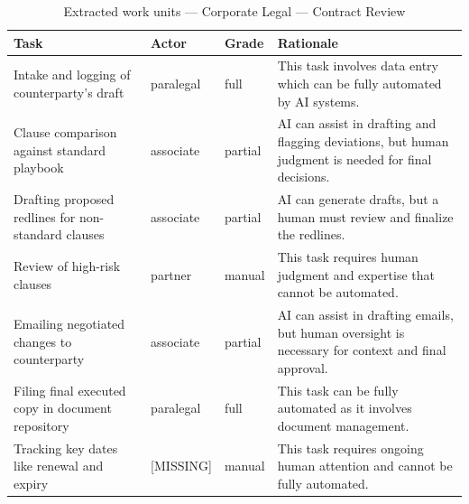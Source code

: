 \begin{table}[htbp]\centering
\small
\caption{Extracted work units — Corporate Legal — Contract Review}
\label{tab:units_law_contract_review}
\begin{tabular}{@{}llll@{}}
\toprule
Task & Actor & Grade & Rationale \\
\midrule
Intake and logging of counterparty's draft & paralegal & full & This task involves data entry which can be fully automated by AI systems. \\
Clause comparison against standard playbook & associate & partial & AI can assist in drafting and flagging deviations, but human judgment is needed for final decisions. \\
Drafting proposed redlines for non-standard clauses & associate & partial & AI can generate drafts, but a human must review and finalize the redlines. \\
Review of high-risk clauses & partner & manual & This task requires human judgment and expertise that cannot be automated. \\
Emailing negotiated changes to counterparty & associate & partial & AI can assist in drafting emails, but human oversight is necessary for context and final approval. \\
Filing final executed copy in document repository & paralegal & full & This task can be fully automated as it involves document management. \\
Tracking key dates like renewal and expiry & [MISSING] & manual & This task requires ongoing human attention and cannot be fully automated. \\
\bottomrule
\end{tabular}
\end{table}